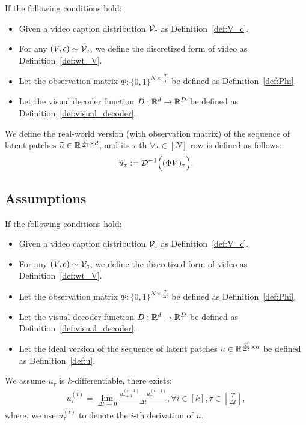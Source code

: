 \begin{definition}\label{def:wt_u}
    If the following conditions hold:
    \begin{itemize}
        \item Given a video caption distribution ${\cal V}_c$ as Definition~\ref{def:V_c}.
        \item For any $(V, c) \sim {\cal V}_c$, we define the discretized form of video as Definition~\ref{def:wt_V}.
        \item Let the observation matrix $\Phi: \{0, 1\}^{N \times \frac{T}{\Delta t}}$ be defined as Definition~\ref{def:Phi}.
        \item Let the visual decoder function $D: \mathbb{R}^d \rightarrow \mathbb{R}^D$ be defined as Definition~\ref{def:visual_decoder}.
    \end{itemize}
    We define the real-world version (with observation matrix) of the sequence of latent patches $\widetilde{u} \in \mathbb{R}^{\frac{T}{\Delta t} \times d}$, and its $\tau$-th $ \forall \tau \in [N]$ row is defined as follows:
    \begin{align*}
        \widetilde{u}_\tau := {\cal D}^{-1}\Big( (\Phi V)_\tau \Big).
    \end{align*}
\end{definition}


\subsection{Assumptions} \label{sub:app:assumption}

\begin{assumption}\label{ass:k}
    If the following conditions hold:
    \begin{itemize}
        \item Given a video caption distribution ${\cal V}_c$ as Definition~\ref{def:V_c}.
        \item For any $(V, c) \sim {\cal V}_c$, we define the discretized form of video as Definition~\ref{def:wt_V}.
        \item Let the observation matrix $\Phi: \{0, 1\}^{N \times \frac{T}{\Delta t}}$ be defined as Definition~\ref{def:Phi}.
        \item Let the visual decoder function $D: \mathbb{R}^d \rightarrow \mathbb{R}^D$ be defined as Definition~\ref{def:visual_decoder}.
        \item Let the ideal version of the sequence of latent patches $u \in \mathbb{R}^{\frac{T}{\Delta t} \times d}$ be defined as Definition~\ref{def:u}.
    \end{itemize}
    We assume $u_\tau$ is $k$-differentiable, there exists:
    \begin{align*}
        u_{\tau}^{(i)} = \lim_{\Delta t \rightarrow 0} \frac{u_{\tau+1}^{(i-1)} - u_{\tau}^{(i-1)}}{ \Delta t }, \forall i \in [k], \tau \in [\frac{T}{\Delta t}],
    \end{align*}
    where, we use $u_\tau^{(i)}$ to denote the $i$-th derivation of $u$.
\end{assumption}

